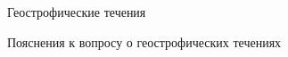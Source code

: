 \begin{chapter}{Геострофические течения}
\begin{section}{Пояснения к вопросу о геострофических течениях}
% 
%
%


\end{section}
\end{chapter}
